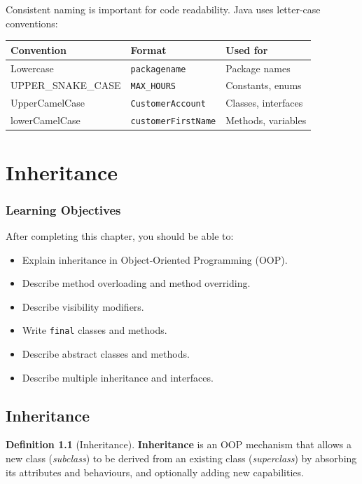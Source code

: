 \documentclass[11pt, a4paper, notitlepage]{report}
\theoremstyle{definition}
\newtheorem{definition}[theorem]{Definition}
\theoremstyle{remark}
\theoremstyle{definition}
\begin{document}
Consistent naming is important for code readability. Java uses letter-case conventions:

\begin{center}
\begin{tabular}{lll}
\toprule
\textbf{Convention} & \textbf{Format} & \textbf{Used for} \\
\midrule
Lowercase & \texttt{packagename} & Package names \\
UPPER\_SNAKE\_CASE & \texttt{MAX\_HOURS} & Constants, enums \\
UpperCamelCase & \texttt{CustomerAccount} & Classes, interfaces \\
lowerCamelCase & \texttt{customerFirstName} & Methods, variables \\
\bottomrule
\end{tabular}
\end{center}

%

\chapter{Inheritance}
\label{chap:inheritance}

\subsection{Learning Objectives}
\label{sec:ch3-objectives}

After completing this chapter, you should be able to:
\begin{itemize}
    \item Explain inheritance in Object-Oriented Programming (OOP).
    \item Describe method overloading and method overriding.
    \item Describe visibility modifiers.
    \item Write \texttt{final} classes and methods.
    \item Describe abstract classes and methods.
    \item Describe multiple inheritance and interfaces.
\end{itemize}

%
\section{Inheritance}
\label{sec:ch3-inheritance-concept}

\begin{definition}[Inheritance]
\label{def:ch3-inheritance}
\textbf{Inheritance} is an OOP mechanism that allows a new class (\emph{subclass}) to be derived from an existing class (\emph{superclass}) by absorbing its attributes and behaviours, and optionally adding new capabilities.
\end{definition}
\end{document}
